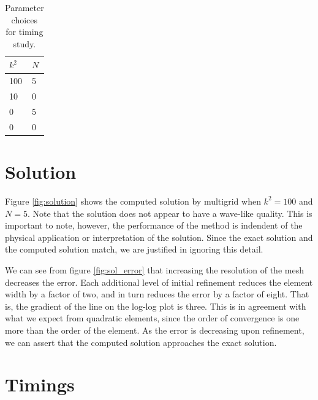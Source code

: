 \bgroup
\def\arraystretch{1.2}
\begin{table}[h]
    \centering
    \begin{tabular}{C{2cm}|C{2cm}}
        $k^2$ & $N$ \\ & 5 \\
        10 & 0 \\
        0 & 5 \\
        0 & 0
    \end{tabular}
    \caption{\label{tab:params} Parameter choices for timing study.}
\end{table}
\egroup




\section{Solution}



Figure \ref{fig:solution} shows the computed solution by multigrid when $k^2=100$ and $N=5$.
Note that the solution does not appear to have a wave-like quality.
This is important to note, however, the performance of the method is indendent of the physical application or interpretation of the solution.
Since the exact solution and the computed solution match, we are justified in ignoring this detail.

We can see from figure \ref{fig:sol_error} that increasing the resolution of the mesh decreases the error.
Each additional level of initial refinement reduces the element width by a factor of two, and in turn reduces the error by a factor of eight.
That is, the gradient of the line on the log-log plot is three.
This is in agreement with what we expect from quadratic elements, since the order of convergence is one more than the order of the element.
As the error is decreasing upon refinement, we can assert that the computed solution approaches the exact solution.








\section{Timings}

